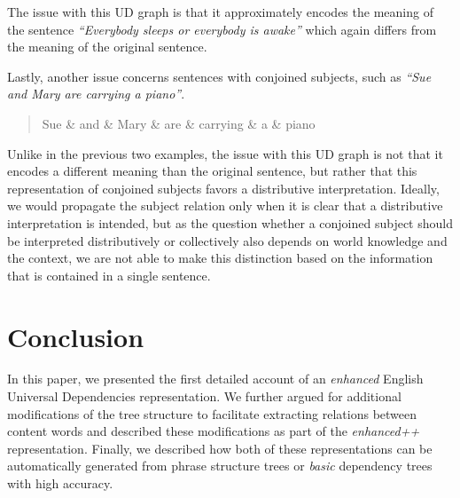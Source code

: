 \documentclass[10pt, a4paper]{article}
\begin{document}
The issue with this UD graph is that it approximately encodes the meaning
of the sentence \textit{``Everybody sleeps or everybody is awake''} which again differs
from the meaning of the original sentence.

Lastly, another issue concerns sentences with conjoined subjects, such as \textit{``Sue and Mary are carrying a piano''}.

\begin{quote}
\begin{center}
\begin{dependency}[column sep=0.2em, edge unit distance=2.25ex]
  \begin{deptext}
    Sue \& and \& Mary \& are \& carrying \& a \& piano \\
  \end{deptext}
\end{dependency}
\end{center}
\end{quote}

Unlike in the previous two examples, the issue with this UD graph is not that it encodes a different meaning than the original sentence, 
but rather that this representation of conjoined subjects favors a distributive interpretation. Ideally, we would propagate 
the subject relation only when it is clear that a distributive interpretation is intended, but as the question whether a conjoined subject should be interpreted distributively or collectively also depends on world knowledge and the context, we are not able to make this distinction based on
the information that is contained in a single sentence.


\section{Conclusion}

In this paper, we presented the first detailed account of an \textit{enhanced} 
English Universal Dependencies representation. We further argued for additional
modifications of the tree structure to facilitate extracting relations between 
content words and described these modifications as part of the \textit{enhanced++}
representation. Finally, we described how both of these representations can be 
automatically generated from phrase structure trees or \textit{basic} dependency trees
with high accuracy.
\end{document}
